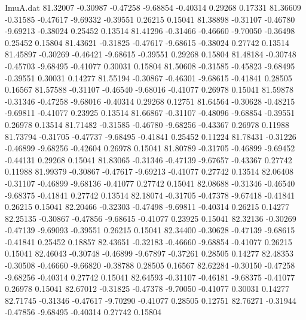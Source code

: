 \begin{filecontents}{ImuA.dat}
  81.32007   -0.30987   -0.47258   -9.68854   -0.40314    0.29268    0.17331
  81.36609   -0.31585   -0.47617   -9.69332   -0.39551    0.26215    0.15041
  81.38898   -0.31107   -0.46780   -9.69213   -0.38024    0.25452    0.13514
  81.41296   -0.31466   -0.46660   -9.70050   -0.36498    0.25452    0.15804
  81.43621   -0.31825   -0.47617   -9.68615   -0.38024    0.27742    0.13514
  81.45897   -0.30269   -0.46421   -9.68615   -0.39551    0.29268    0.15804
  81.48184   -0.30748   -0.45703   -9.68495   -0.41077    0.30031    0.15804
  81.50608   -0.31585   -0.45823   -9.68495   -0.39551    0.30031    0.14277
  81.55194   -0.30867   -0.46301   -9.68615   -0.41841    0.28505    0.16567
  81.57588   -0.31107   -0.46540   -9.68016   -0.41077    0.26978    0.15041
  81.59878   -0.31346   -0.47258   -9.68016   -0.40314    0.29268    0.12751
  81.64564   -0.30628   -0.48215   -9.69811   -0.41077    0.23925    0.13514
  81.66867   -0.31107   -0.48096   -9.68854   -0.39551    0.26978    0.13514
  81.71482   -0.31585   -0.46780   -9.68256   -0.43367    0.26978    0.11988
  81.73794   -0.31705   -0.47737   -9.68495   -0.41841    0.25452    0.11224
  81.78431   -0.31226   -0.46899   -9.68256   -0.42604    0.26978    0.15041
  81.80789   -0.31705   -0.46899   -9.69452   -0.44131    0.29268    0.15041
  81.83065   -0.31346   -0.47139   -9.67657   -0.43367    0.27742    0.11988
  81.99379   -0.30867   -0.47617   -9.69213   -0.41077    0.27742    0.13514
  82.06408   -0.31107   -0.46899   -9.68136   -0.41077    0.27742    0.15041
  82.08688   -0.31346   -0.46540   -9.68375   -0.41841    0.27742    0.13514
  82.18074   -0.31705   -0.47378   -9.67418   -0.41841    0.26215    0.15041
  82.20466   -0.32303   -0.47498   -9.69811   -0.40314    0.26215    0.14277
  82.25135   -0.30867   -0.47856   -9.68615   -0.41077    0.23925    0.15041
  82.32136   -0.30269   -0.47139   -9.69093   -0.39551    0.26215    0.15041
  82.34400   -0.30628   -0.47139   -9.68615   -0.41841    0.25452    0.18857
  82.43651   -0.32183   -0.46660   -9.68854   -0.41077    0.26215    0.15041
  82.46043   -0.30748   -0.46899   -9.67897   -0.37261    0.28505    0.14277
  82.48353   -0.30508   -0.46660   -9.66820   -0.38788    0.28505    0.16567
  82.62284   -0.30150   -0.47258   -9.68256   -0.40314    0.27742    0.15041
  82.64593   -0.31107   -0.46181   -9.68375   -0.41077    0.26978    0.15041
  82.67012   -0.31825   -0.47378   -9.70050   -0.41077    0.30031    0.14277
  82.71745   -0.31346   -0.47617   -9.70290   -0.41077    0.28505    0.12751
  82.76271   -0.31944   -0.47856   -9.68495   -0.40314    0.27742    0.15804

\end{filecontents}
